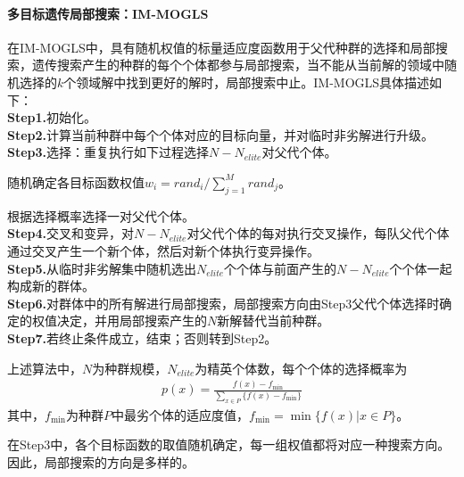            \paragraph{多目标遗传局部搜索：IM-MOGLS}
            在IM-MOGLS中，具有随机权值的标量适应度函数用于父代种群的选择和局部搜索，遗传搜索产生的种群的每个个体都参与局部搜索，当不能从当前解的领域中随机选择的$k$个领域解中找到更好的解时，局部搜索中止。IM-MOGLS具体描述如下：\\
            \textbf{Step1.}初始化。\\
            \textbf{Step2.}计算当前种群中每个个体对应的目标向量，并对临时非劣解进行升级。\\
            \textbf{Step3.}选择：重复执行如下过程选择$N-N_{elite}$对父代个体。
            \par
            随机确定各目标函数权值$w_i=rand_i/{\mathop{\sum}\limits_{j=1}^Mrand_j}$。
            \par
            根据选择概率选择一对父代个体。\\
            \textbf{Step4.}交叉和变异，对$N-N_{elite}$对父代个体的每对执行交叉操作，每队父代个体通过交叉产生一个新个体，然后对新个体执行变异操作。\\
            \textbf{Step5.}从临时非劣解集中随机选出$N_{elite}$个个体与前面产生的$N-N_{elite}$个个体一起构成新的群体。\\
            \textbf{Step6.}对群体中的所有解进行局部搜索，局部搜索方向由Step3父代个体选择时确定的权值决定，并用局部搜索产生的$N$新解替代当前种群。\\
            \textbf{Step7.}若终止条件成立，结束；否则转到Step2。
            \par
            上述算法中，$N$为种群规模，$N_{elite}$为精英个体数，每个个体的选择概率为
                \begin{align}
                  p(x) = \frac{f(x)-f_{\min}}{\mathop{\sum}\limits_{x\in P}\{f(x)-f_{\min}\}}
                \end{align}
            其中，$f_{\min}$为种群$P$中最劣个体的适应度值，$f_{\min}=\min\{f(x)|x\in P\}$。
            \par
            在Step3中，各个目标函数的取值随机确定，每一组权值都将对应一种搜索方向。因此，局部搜索的方向是多样的。
